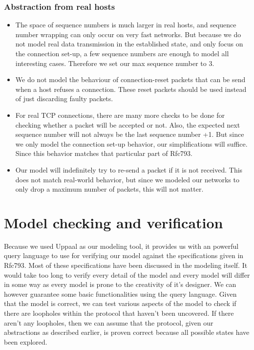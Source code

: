 \documentclass[twocolumn]{article}
\begin{document}
\subsubsection{Abstraction from real hosts}
\begin{itemize}
\item The space of sequence numbers is much larger in real hosts, and sequence number wrapping can only occur on very fast networks. But because we do not model real data transmission in the established state, and only focus on the connection set-up, a few sequence numbers are enough to model all interesting cases. Therefore we set our max sequence number to 3.
\item We do not model the behaviour of connection-reset packets that can be send when a host refuses a connection. These reset packets should be used instead of just discarding faulty packets.
\item For real TCP connections, there are many more checks to be done for checking whether a packet will be accepted or not. Also, the expected next sequence number will not always be the last sequence number +1. But since we only model the connection set-up behavior, our simplifications will suffice. Since this behavior matches that particular part of Rfc793.
\item Our model will indefinitely try to re-send a packet if it is not received. This does not match real-world behavior, but since we modeled our networks to only drop a maximum number of packets, this will not matter.
\end{itemize}






\section{Model checking and verification} %
\label{sec:model_checking_and_verification}
	Because we used Uppaal as our modeling tool, it provides us with an powerful query language to use for verifying our model against the specifications given in Rfc793. Most of these specifications have been discussed in the modeling itself. It would take too long to verify every detail of the model and every model will differ in some way as every model is prone to the creativity of it's designer. We can however guarantee some basic functionalities using the query language. Given that the model is correct, we can test various aspects of the model to check if there are loopholes within the protocol that haven't been uncovered. If there aren't any loopholes, then we can assume that the protocol, given our abstractions as described earlier, is proven correct because all possible states have been explored.
\end{document}
